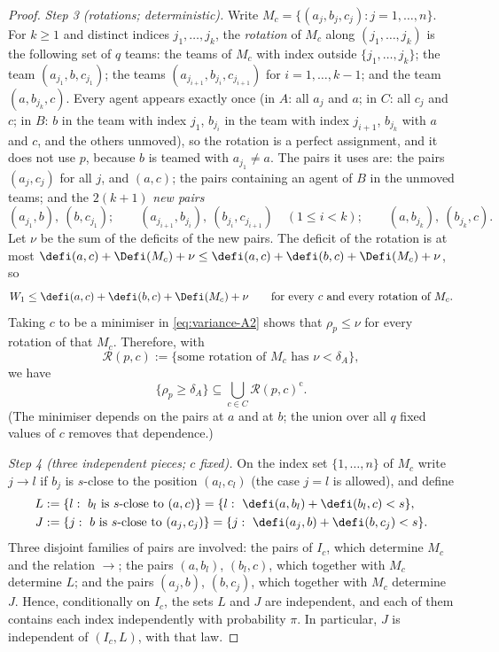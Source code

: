 \begin{proof}
\emph{Step 3 (rotations; deterministic).} Write $M_c=\{(a_j,b_j,c_j):j=1,\dots,n\}$. For
$k\ge1$ and distinct indices $j_1,\dots,j_k$, the \emph{rotation} of $M_c$ along
$(j_1,\dots,j_k)$ is the following set of $q$ teams: the teams of $M_c$ with index outside
$\{j_1,\dots,j_k\}$; the team $(a_{j_1},b,c_{j_1})$; the teams
$(a_{j_{i+1}},b_{j_i},c_{j_{i+1}})$ for $i=1,\dots,k-1$; and the team $(a,b_{j_k},c)$.
Every agent appears exactly once (in $A$: all $a_j$ and $a$; in $C$: all $c_j$ and $c$; in
$B$: $b$ in the team with index $j_1$, $b_{j_i}$ in the team with index $j_{i+1}$,
$b_{j_k}$ with $a$ and $c$, and the others unmoved), so the rotation is a perfect
assignment, and it does not use $p$, because $b$ is teamed with $a_{j_1}\ne a$. The pairs
it uses are: the pairs $(a_j,c_j)$ for all $j$, and $(a,c)$; the pairs containing an agent
of $B$ in the unmoved teams; and the $2(k+1)$ \emph{new pairs}
\[
(a_{j_1},b),\ (b,c_{j_1});\qquad
(a_{j_{i+1}},b_{j_i}),\ (b_{j_i},c_{j_{i+1}})\quad(1\le i<k);\qquad
(a,b_{j_k}),\ (b_{j_k},c).
\]
Let $\nu$ be the sum of the deficits of the new pairs. The deficit of the rotation is at
most $\defi(a,c)+\Defi(M_c)+\nu\le\defi(a,c)+\defi(b,c)+\Defi(M_c)+\nu$, so
\[
W_1\le\defi(a,c)+\defi(b,c)+\Defi(M_c)+\nu\qquad
\text{for every $c$ and every rotation of $M_c$.}
\]
Taking $c$ to be a minimiser in \eqref{eq:variance-A2} shows that $\rho_p\le\nu$ for every
rotation of that $M_c$. Therefore, with
\[
\mathcal R(p,c):=\{\text{some rotation of $M_c$ has }\nu<\delta_A\},
\]
we have
\begin{equation}\label{eq:variance-A3}
\{\rho_p\ge\delta_A\}\subseteq\bigcup_{c\in C}\mathcal R(p,c)^{\mathrm c}.
\end{equation}
(The minimiser depends on the pairs at $a$ and at $b$; the union over all $q$ fixed values
of $c$ removes that dependence.)

\emph{Step 4 (three independent pieces; $c$ fixed).} On the index set $\{1,\dots,n\}$ of
$M_c$ write $j\to l$ if $b_j$ is $s$-close to the position $(a_l,c_l)$ (the case $j=l$ is
allowed), and define
\begin{align*}
L&:=\{l:\ b_l\text{ is $s$-close to }(a,c)\}=\{l:\ \defi(a,b_l)+\defi(b_l,c)<s\},\\
J&:=\{j:\ b\text{ is $s$-close to }(a_j,c_j)\}=\{j:\ \defi(a_j,b)+\defi(b,c_j)<s\}.
\end{align*}
Three disjoint families of pairs are involved: the pairs of $I_c$, which determine $M_c$
and the relation $\to$; the pairs $(a,b_l)$, $(b_l,c)$, which together with $M_c$ determine
$L$; and the pairs $(a_j,b)$, $(b,c_j)$, which together with $M_c$ determine $J$. Hence,
conditionally on $I_c$, the sets $L$ and $J$ are independent, and each of them contains
each index independently with probability $\pi$. In particular, $J$ is independent of
$(I_c,L)$, with that law.


\end{proof}
